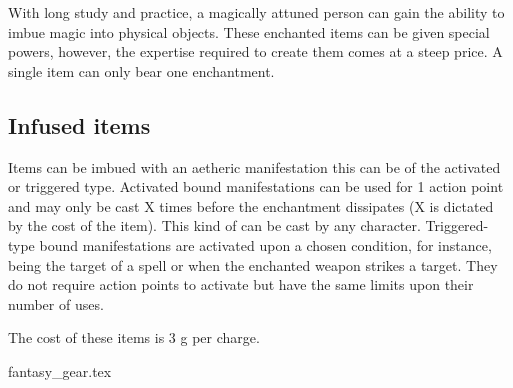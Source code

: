 \documentclass[a4paper,11pt,oneside]{book}
\newcommand{\textlf}[1]{\textbf{\titlecap{#1}}}
\begin{document}
With long study and practice, a magically attuned person can gain the ability to imbue magic into physical objects. These enchanted items can be given special powers, however, the expertise required to create them comes at a steep price. A single item can only bear one enchantment.

\subsection{Infused items}
Items can be imbued with an aetheric manifestation this can be of the activated or triggered type. Activated bound manifestations can be used for 1 action point and may only be cast X times before the enchantment dissipates (X is dictated by the cost of the item). This kind of \textlf{Bound spell} can be cast by any character. Triggered-type bound manifestations are activated upon a chosen condition, for instance, being the target of a spell or when the enchanted weapon strikes a target. They do not require action points to activate but have the same limits upon their number of uses. 

The cost of these items is 3 g per charge.

%







{fantasy_gear.tex}




\listoftables
\end{document}
